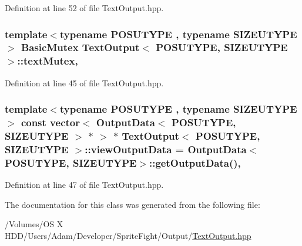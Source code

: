 Definition at line 52 of file Text\-Output.\-hpp.

\hypertarget{class_text_output_a64b0160aa7e8ebe7b65744197886662e}{
\subsubsection[{text\-Mutex}]{\setlength{\rightskip}{0pt plus 5cm}template$<$typename P\-O\-S\-U\-T\-Y\-P\-E , typename S\-I\-Z\-E\-U\-T\-Y\-P\-E $>$ {\bf Basic\-Mutex} {\bf Text\-Output}$<$ P\-O\-S\-U\-T\-Y\-P\-E, S\-I\-Z\-E\-U\-T\-Y\-P\-E $>$\-::text\-Mutex\hspace{0.3cm}{\ttfamily [static]}, {\ttfamily [protected]}}}\label{class_text_output_a64b0160aa7e8ebe7b65744197886662e}


Definition at line 45 of file Text\-Output.\-hpp.

\hypertarget{class_text_output_ae8c77617052494529e2e15a1379c8fa2}{
\subsubsection[{view\-Output\-Data}]{\setlength{\rightskip}{0pt plus 5cm}template$<$typename P\-O\-S\-U\-T\-Y\-P\-E , typename S\-I\-Z\-E\-U\-T\-Y\-P\-E $>$ const vector$<$ {\bf Output\-Data}$<$ P\-O\-S\-U\-T\-Y\-P\-E, S\-I\-Z\-E\-U\-T\-Y\-P\-E $>$ $\ast$ $>$ $\ast$ {\bf Text\-Output}$<$ P\-O\-S\-U\-T\-Y\-P\-E, S\-I\-Z\-E\-U\-T\-Y\-P\-E $>$\-::view\-Output\-Data = {\bf Output\-Data}$<$P\-O\-S\-U\-T\-Y\-P\-E, S\-I\-Z\-E\-U\-T\-Y\-P\-E$>$\-::{\bf get\-Output\-Data}()\hspace{0.3cm}{\ttfamily [static]}, {\ttfamily [protected]}}}\label{class_text_output_ae8c77617052494529e2e15a1379c8fa2}


Definition at line 47 of file Text\-Output.\-hpp.



The documentation for this class was generated from the following file\-:\begin{DoxyCompactItemize}
\item 
/\-Volumes/\-O\-S X H\-D\-D/\-Users/\-Adam/\-Developer/\-Sprite\-Fight/\-Output/\hyperlink{_text_output_8hpp}{Text\-Output.\-hpp}\end{DoxyCompactItemize}
